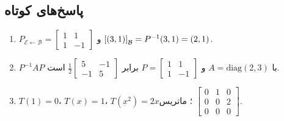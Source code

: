 \subsection*{پاسخ‌های کوتاه}
\begin{enumerate}
  \item $P_{\mathcal{E}\leftarrow\mathcal{B}}=\begin{bmatrix}1&1\\1&-1\end{bmatrix}$ و $\left[(3,1)\right]_{\mathcal{B}}=P^{-1}(3,1)=(2,1)$.
  \item $P^{-1}AP$ با $A=\mathrm{diag}(2,3)$ و $P=\begin{bmatrix}1&1\\1&-1\end{bmatrix}$ برابر $\frac12\begin{bmatrix}5&-1\\-1&5\end{bmatrix}$ است.
  \item $T(1)=0$، $T(x)=1$، $T(x^2)=2x$؛ ماتریس $\begin{bmatrix}0&1&0\\0&0&2\\0&0&0\end{bmatrix}$.
\end{enumerate}
